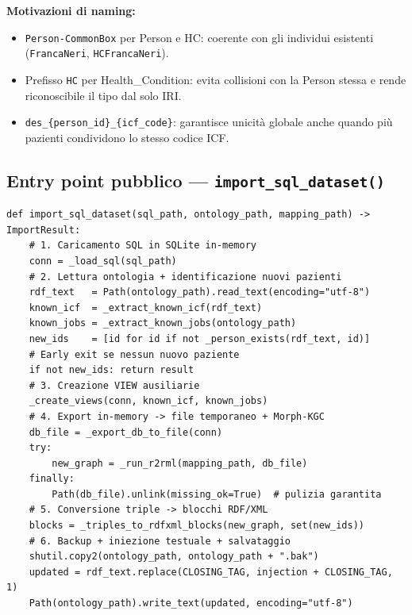 \documentclass[a4paper,12pt]{article}
\begin{document}
\textbf{Motivazioni di naming:}
\begin{itemize}[noitemsep]
  \item \texttt{Person-CommonBox} per Person e HC: coerente con gli individui
        esistenti (\texttt{FrancaNeri}, \texttt{HCFrancaNeri}).
  \item Prefisso \texttt{HC} per Health\_Condition: evita collisioni con
        la Person stessa e rende riconoscibile il tipo dal solo IRI.
  \item \texttt{des\_\{person\_id\}\_\{icf\_code\}}: garantisce unicit\`{a}
        globale anche quando pi\`{u} pazienti condividono lo stesso codice ICF.
\end{itemize}

\subsection{Entry point pubblico --- \texttt{import\_sql\_dataset()}}

\begin{lstlisting}[caption={Sequenza completa dell'entry point pubblico.}]
def import_sql_dataset(sql_path, ontology_path, mapping_path) -> ImportResult:
    # 1. Caricamento SQL in SQLite in-memory
    conn = _load_sql(sql_path)
    # 2. Lettura ontologia + identificazione nuovi pazienti
    rdf_text   = Path(ontology_path).read_text(encoding="utf-8")
    known_icf  = _extract_known_icf(rdf_text)
    known_jobs = _extract_known_jobs(ontology_path)
    new_ids    = [id for id if not _person_exists(rdf_text, id)]
    # Early exit se nessun nuovo paziente
    if not new_ids: return result
    # 3. Creazione VIEW ausiliarie
    _create_views(conn, known_icf, known_jobs)
    # 4. Export in-memory -> file temporaneo + Morph-KGC
    db_file = _export_db_to_file(conn)
    try:
        new_graph = _run_r2rml(mapping_path, db_file)
    finally:
        Path(db_file).unlink(missing_ok=True)  # pulizia garantita
    # 5. Conversione triple -> blocchi RDF/XML
    blocks = _triples_to_rdfxml_blocks(new_graph, set(new_ids))
    # 6. Backup + iniezione testuale + salvataggio
    shutil.copy2(ontology_path, ontology_path + ".bak")
    updated = rdf_text.replace(CLOSING_TAG, injection + CLOSING_TAG, 1)
    Path(ontology_path).write_text(updated, encoding="utf-8")
\end{lstlisting}
\end{document}
